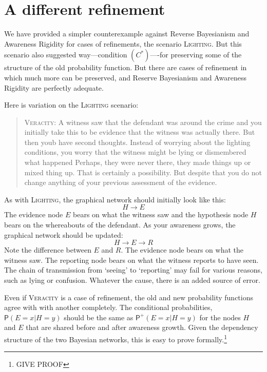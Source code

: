 \documentclass[
  11pt,
  dvipsnames,enabledeprecatedfontcommands]{scrartcl}
\newcommand{\pr}[1]{\ensuremath{\mathsf{P}(#1)}}
\newcommand{\ppr}[2]{\ensuremath{\mathsf{P}^{#1}(#2)}}
\begin{document}
\hypertarget{a-different-refinement}{%
\section{A different refinement}\label{a-different-refinement}}

We have provided a simpler counterexample against Reverse Bayesianism
and Awareness Rigidity for cases of refinements, the scenario
\textsc{Lighting}. But this scenario also suggested way---condition
\((C^*)\)----for preserving some of the structure of the old probability
function. But there are cases of refinement in which much more can be
preserved, and Reserve Bayesianism and Awareness Rigidity are perfectly
adequate.

Here is variation on the \textsc{Lighting} scenario:

\begin{quote}
\textsc{Veracity}: A witness saw that the defendant was around the crime
and you initially take this to be evidence that the witness was actually
there. But then youb have second thoughts. Instead of worrying about the
lighting conditions, you worry that the witness might be lying or
dismembered what happened Perhaps, they were never there, they made
things up or mixed thing up. That is certainly a possibility. But
despite that you do not change anything of your previous assessment of
the evidence.
\end{quote}

As with \textsc{Lighting}, the graphical network should initially look
like this: \[H\rightarrow E\] The evidence node \(E\) bears on what the
witness saw and the hypothesis node \(H\) bears on the whereabouts of
the defendant. As your awareness grows, the graphical network should be
updated: \[H\rightarrow E \rightarrow R\] Note the difference between
\(E\) and \(R\). The evidence node bears on what the witness saw. The
reporting node bears on what the witness reports to have seen. The chain
of transmission from `seeing' to `reporting' may fail for various
reasons, such as lying or confusion. Whatever the cause, there is an
added source of error.

Even if \textsc{Veracity} is a case of refinement, the old and new
probability functions agree with with another completely. The
conditional probabilities, \(\pr{E=x \vert H=y}\) should be the same as
\(\ppr{+}{E=x \vert H=y}\) for the nodes \(H\) and \(E\) that are shared
before and after awareness growth. Given the dependency structure of the
two Bayesian networks, this is easy to prove formally.\footnote{GIVE
  PROOF}
\end{document}
